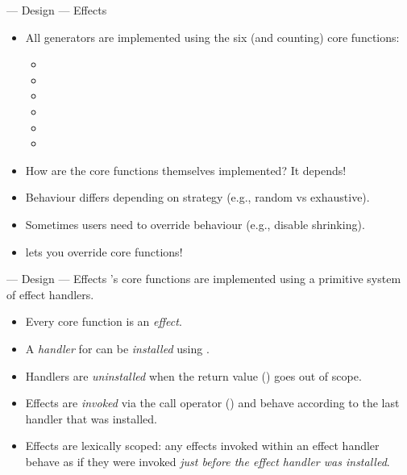 \begin{frame}[fragile]{\halcheck{} --- Design --- Effects}
  \begin{itemize}
    \item All generators are implemented using the six (and counting) core functions:
          \begin{itemize}
            \item {}
            \item {}
            \item {}
            \item {}
            \item {}
            \item {}
          \end{itemize}
    \item How are the core functions themselves implemented?
          \pause{}
          \alert{It depends!}
    \item Behaviour differs depending on strategy (e.g., random vs exhaustive).
    \item Sometimes users need to override behaviour (e.g., disable shrinking).
    \item \halcheck{} lets you \alert{override} core functions!
  \end{itemize}
\end{frame}

\begin{frame}{\halcheck{} --- Design --- Effects}
  \halcheck{}'s core functions are implemented using a primitive system of \alert{effect handlers}.

  \begin{itemize}
    \item<2-> Every core function  is an \emph{effect}.
    \item<3-> A \emph{handler}  for  can be \emph{installed} using .
    \item<4-> Handlers are \emph{uninstalled} when the return value (\cppinline{_}) goes out of scope.
    \item<5-> Effects are \emph{invoked} via the call operator () and behave according to the last handler that was installed.
    \item<6-> Effects are \alert{lexically scoped}: any effects invoked within an effect handler behave as if they were invoked \emph{just before the effect handler was installed}.
  \end{itemize}
\end{frame}

